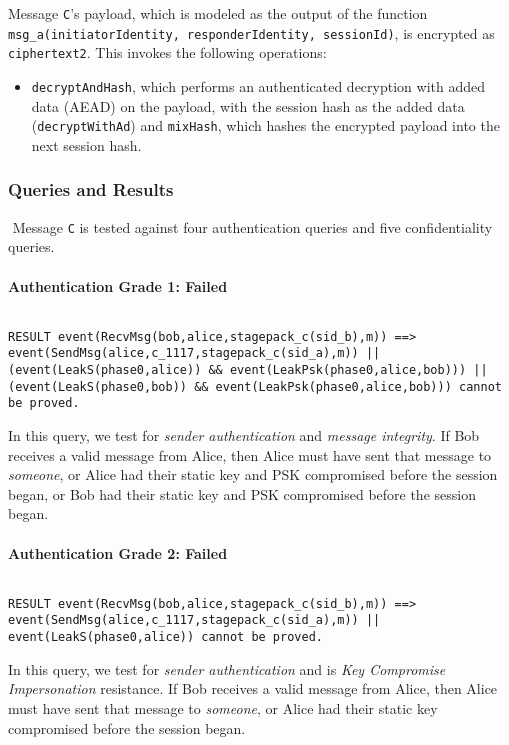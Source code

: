 Message \texttt{C}'s payload, which is modeled as the output of the function \texttt{msg\_a(initiatorIdentity, responderIdentity, sessionId)}, is encrypted as \texttt{ciphertext2}. This invokes the following operations:


\begin{itemize}

\item \texttt{decryptAndHash}, which performs an authenticated decryption with added data (AEAD) on the payload, with the session hash as the added data (\texttt{decryptWithAd}) and \texttt{mixHash}, which hashes the encrypted payload into the next session hash.

\end{itemize}
\subsubsection{Queries and Results}$ $
Message \texttt{C} is tested against four authentication queries and five confidentiality queries.
\paragraph{Authentication Grade 1: Failed}$ $
\begin{lstlisting}
RESULT event(RecvMsg(bob,alice,stagepack_c(sid_b),m)) ==> event(SendMsg(alice,c_1117,stagepack_c(sid_a),m)) || (event(LeakS(phase0,alice)) && event(LeakPsk(phase0,alice,bob))) || (event(LeakS(phase0,bob)) && event(LeakPsk(phase0,alice,bob))) cannot be proved.
\end{lstlisting}

In this query, we test for \emph{sender authentication} and \emph{message integrity}. If Bob receives a valid message from Alice, then Alice must have sent that message to \emph{someone}, or Alice had their static key and PSK compromised before the session began, or Bob had their static key and PSK compromised before the session began.


\paragraph{Authentication Grade 2: Failed}$ $
\begin{lstlisting}
RESULT event(RecvMsg(bob,alice,stagepack_c(sid_b),m)) ==> event(SendMsg(alice,c_1117,stagepack_c(sid_a),m)) || event(LeakS(phase0,alice)) cannot be proved.
\end{lstlisting}

In this query, we test for \emph{sender authentication} and is \emph{Key Compromise Impersonation} resistance. If Bob receives a valid message from Alice, then Alice must have sent that message to \emph{someone}, or Alice had their static key compromised before the session began.


